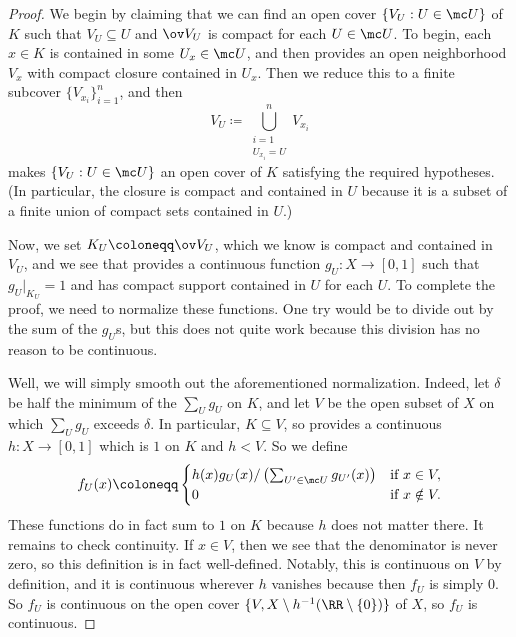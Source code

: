 \documentclass[../notes.tex]{subfiles}
\begin{document}
\begin{proof}
	We begin by claiming that we can find an open cover $\{V_U:U\in\mc U\}$ of $K$ such that $V_U\subseteq U$ and $\ov V_U$ is compact for each $U\in\mc U$. To begin, each $x\in K$ is contained in some $U_x\in\mc U$, and then  provides an open neighborhood $V_x$ with compact closure contained in $U_x$. Then we reduce this to a finite subcover $\{V_{x_i}\}_{i=1}^n$, and then
	\[V_U\coloneqq\bigcup_{\substack{i=1\\U_{x_i}=U}}^nV_{x_i}\]
	makes $\{V_U:U\in\mc U\}$ an open cover of $K$ satisfying the required hypotheses. (In particular, the closure is compact and contained in $U$ because it is a subset of a finite union of compact sets contained in $U$.)

	Now, we set $K_U\coloneqq\ov V_U$, which we know is compact and contained in $V_U$, and we see that  provides a continuous function $g_U\colon X\to[0,1]$ such that $g_U|_{K_U}=1$ and has compact support contained in $U$ for each $U$. To complete the proof, we need to normalize these functions. One try would be to divide out by the sum of the $g_U$s, but this does not quite work because this division has no reason to be continuous.
	
	Well, we will simply smooth out the aforementioned normalization. Indeed, let $\delta$ be half the minimum of the $\sum_Ug_U$ on $K$, and let $V$ be the open subset of $X$ on which $\sum_Ug_U$ exceeds $\delta$. In particular, $K\subseteq V$, so  provides a continuous $h\colon X\to[0,1]$ which is $1$ on $K$ and $h<V$. So we define
	\[f_U(x)\coloneqq\begin{cases}
		h(x)g_U(x)/\left(\sum_{U'\in\mc U}g_{U'}(x)\right) & \text{if }x\in V, \\
		0 & \text{if }x\notin V.
	\end{cases}\]
	These functions do in fact sum to $1$ on $K$ because $h$ does not matter there. It remains to check continuity. If $x\in V$, then we see that the denominator is never zero, so this definition is in fact well-defined. Notably, this is continuous on $V$ by definition, and it is continuous wherever $h$ vanishes because then $f_U$ is simply $0$. So $f_U$ is continuous on the open cover $\{V,X\setminus h^{-1}(\RR\setminus\{0\})\}$ of $X$, so $f_U$ is continuous.
\end{proof}
\end{document}
